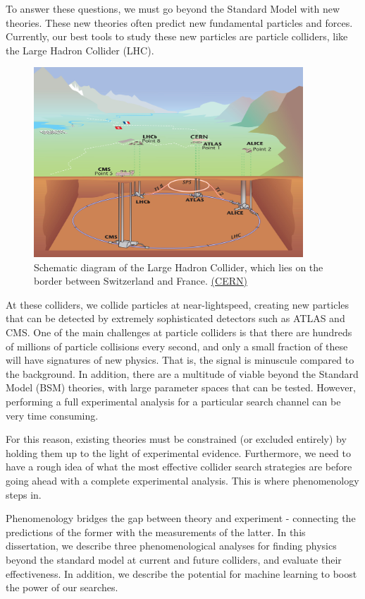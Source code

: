 To answer these questions, we must go beyond the Standard Model with new theories. These new theories often predict new fundamental particles and forces. Currently, our best tools to study these new particles are particle colliders, like the Large Hadron Collider (LHC).

\begin{figure}
  \centering
  \includegraphics[width=0.9\textwidth]{gfx/LHC}
  \caption{Schematic diagram of the Large Hadron Collider, which lies on the border between Switzerland and France. \href{http://cds.cern.ch/journal/CERNBulletin/2008/38/News\%20Articles/1125888?ln=en}{(CERN)}}
\end{figure}

At these colliders, we collide particles at near-lightspeed, creating new particles that can be detected by extremely sophisticated detectors such as ATLAS and CMS. One of the main challenges at particle colliders is that there are hundreds of millions of particle collisions every second, and only a small fraction of these will have signatures of new physics. That is, the signal is minuscule compared to the background. In addition, there are a multitude of viable beyond the Standard Model (BSM) theories, with large parameter spaces that can be tested. However, performing a full experimental analysis for a particular search channel can be very time consuming.

For this reason, existing theories must be constrained (or excluded entirely) by holding them up to the light of experimental evidence. Furthermore, we need to have a rough idea of what the most effective collider search strategies are before going ahead with a complete experimental analysis. This is where phenomenology steps in.

Phenomenology bridges the gap between theory and experiment - connecting the predictions of the former with the measurements of the latter. In this dissertation, we describe three phenomenological analyses for finding physics beyond the standard model at current and future colliders, and evaluate their effectiveness. In addition, we describe the potential for machine learning to boost the power of our searches.



